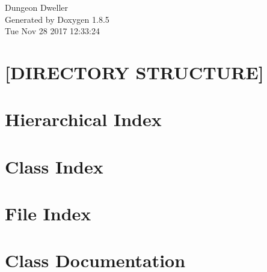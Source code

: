 \documentclass[twoside]{book}
\newcommand{\clearemptydoublepage}{%
  \newpage{\pagestyle{empty}\cleardoublepage}%
}
\begin{document}
\hypersetup{pageanchor=false}
\begin{titlepage}
\vspace*{7cm}
\begin{center}%
{\Large Dungeon Dweller }\\
\vspace*{1cm}
{\large Generated by Doxygen 1.8.5}\\
\vspace*{0.5cm}
{\small Tue Nov 28 2017 12:33:24}\\
\end{center}
\end{titlepage}
\clearemptydoublepage
\tableofcontents
\clearemptydoublepage
{}
\hypersetup{pageanchor=true}

\chapter{\mbox{[}D\-I\-R\-E\-C\-T\-O\-R\-Y S\-T\-R\-U\-C\-T\-U\-R\-E\mbox{]}}
\label{md__home_rigt2720_Kodika_README}
\hypertarget{md__home_rigt2720_Kodika_README}{}

\chapter{Hierarchical Index}

\chapter{Class Index}

\chapter{File Index}

\chapter{Class Documentation}

























































\end{document}
